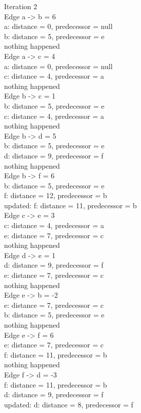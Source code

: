 \noindent Iteration 2\\
Edge a -> b = 6\\
a: distance = 0, predecessor = null\\
b: distance = 5, predecessor = e\\
nothing happened\\
Edge a -> c = 4\\
a: distance = 0, predecessor = null\\
c: distance = 4, predecessor = a\\
nothing happened\\
Edge b -> c = 1\\
b: distance = 5, predecessor = e\\
c: distance = 4, predecessor = a\\
nothing happened\\
Edge b -> d = 5\\
b: distance = 5, predecessor = e\\
d: distance = 9, predecessor = f\\
nothing happened\\
Edge b -> f = 6\\
b: distance = 5, predecessor = e\\
f: distance = 12, predecessor = b\\
updated: f: distance = 11, predecessor = b\\
Edge c -> e = 3\\
c: distance = 4, predecessor = a\\
e: distance = 7, predecessor = c\\
nothing happened\\
Edge d -> e = 1\\
d: distance = 9, predecessor = f\\
e: distance = 7, predecessor = c\\
nothing happened\\
Edge e -> b = -2\\
e: distance = 7, predecessor = c\\
b: distance = 5, predecessor = e\\
nothing happened\\
Edge e -> f = 6\\
e: distance = 7, predecessor = c\\
f: distance = 11, predecessor = b\\
nothing happened\\
Edge f -> d = -3\\
f: distance = 11, predecessor = b\\
d: distance = 9, predecessor = f\\
updated: d: distance = 8, predecessor = f\\

